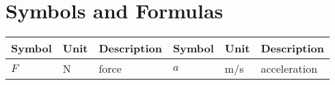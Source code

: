 \cleardoublepage
\section*{Symbols and Formulas}

\begin{table}[h!]
	\begin{tabularx}{\linewidth}{p{2cm} p{1cm} X p{2cm} p{1cm} X}
		\textbf{Symbol}	& \textbf{Unit}	& \textbf{Description} & \textbf{Symbol} & \textbf{Unit} & \textbf{Description} \\ \hline\hline
		$F$		& \unit{N}		& force			& $a$		& \unit{m/s}	& acceleration \\
	\end{tabularx}
\end{table}